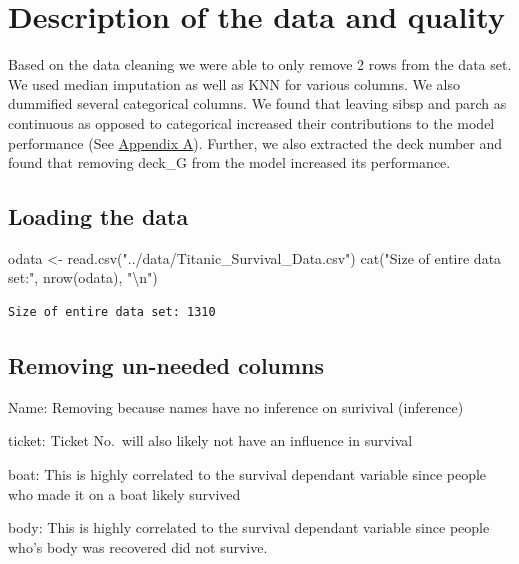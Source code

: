 \documentclass[
  letterpaper,
  DIV=11,
  numbers=noendperiod]{scrartcl}
\newenvironment{Shaded}{\begin{snugshade}}{\end{snugshade}}
\newcommand{\FunctionTok}[1]{\textcolor[rgb]{0.28,0.35,0.67}{#1}}
\newcommand{\NormalTok}[1]{\textcolor[rgb]{0.00,0.23,0.31}{#1}}
\newcommand{\OtherTok}[1]{\textcolor[rgb]{0.00,0.23,0.31}{#1}}
\newcommand{\SpecialCharTok}[1]{\textcolor[rgb]{0.37,0.37,0.37}{#1}}
\newcommand{\StringTok}[1]{\textcolor[rgb]{0.13,0.47,0.30}{#1}}
\begin{document}
\section{Description of the data and
quality}\label{description-of-the-data-and-quality}

Based on the data cleaning we were able to only remove 2 rows from the
data set. We used median imputation as well as KNN for various columns.
We also dummified several categorical columns. We found that leaving
sibsp and parch as continuous as opposed to categorical increased their
contributions to the model performance (See
\hyperref[appendix_A]{Appendix A}). Further, we also extracted the deck
number and found that removing deck\_G from the model increased its
performance.

\subsection{Loading the data}\label{loading-the-data}

\begin{Shaded}
\begin{Highlighting}[]
\NormalTok{odata }\OtherTok{\textless{}{-}} \FunctionTok{read.csv}\NormalTok{(}\StringTok{"../data/Titanic\_Survival\_Data.csv"}\NormalTok{)}
\FunctionTok{cat}\NormalTok{(}\StringTok{"Size of entire data set:"}\NormalTok{, }\FunctionTok{nrow}\NormalTok{(odata), }\StringTok{"}\SpecialCharTok{\textbackslash{}n}\StringTok{"}\NormalTok{)}
\end{Highlighting}
\end{Shaded}

\begin{verbatim}
Size of entire data set: 1310 
\end{verbatim}

\subsection{Removing un-needed
columns}\label{removing-un-needed-columns}

Name: Removing because names have no inference on surivival (inference)

ticket: Ticket No.~will also likely not have an influence in survival

boat: This is highly correlated to the survival dependant variable since
people who made it on a boat likely survived

body: This is highly correlated to the survival dependant variable since
people who's body was recovered did not survive.
\end{document}
